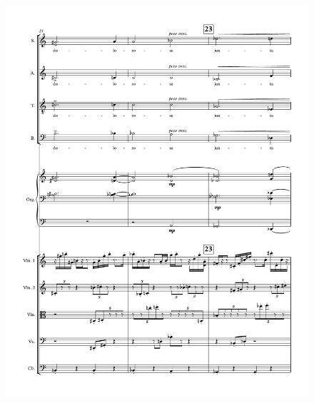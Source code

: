 \begin{figure}[htbp]
    \centering
	\includegraphics[width=6.5in]{figures/Stabat_Mater_4.pdf}
\end{figure}

